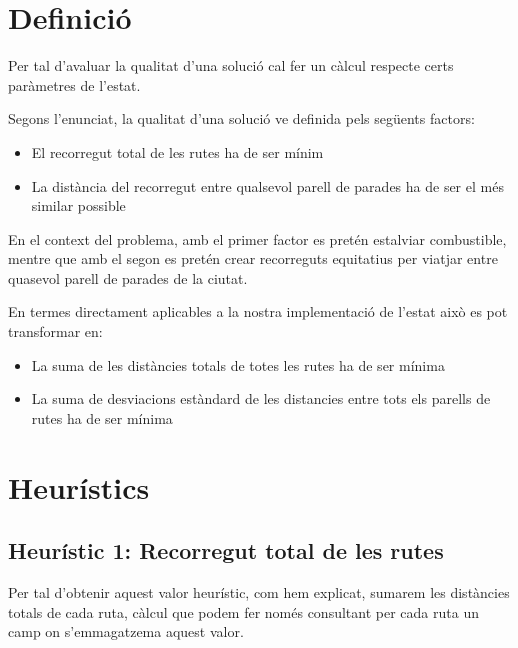
\section{Definició} %
\label{sec:definicio}

Per tal d'avaluar la qualitat d'una solució cal fer un càlcul respecte certs paràmetres de l'estat.

Segons l'enunciat, la qualitat d'una solució ve definida pels següents factors:

\begin{itemize}
	\item El recorregut total de les rutes ha de ser mínim
	\item La distància del recorregut entre qualsevol parell de parades ha de ser el més similar possible
\end{itemize}

En el context del problema, amb el primer factor es pretén estalviar combustible, mentre que amb el segon es pretén crear recorreguts equitatius per viatjar entre quasevol parell de parades de la ciutat.

En termes directament aplicables a la nostra implementació de l'estat això es pot transformar en:

\begin{itemize}
	\item La suma de les distàncies totals de totes les rutes ha de ser mínima
	\item La suma de desviacions estàndard de les distancies entre tots els parells de rutes ha de ser mínima
\end{itemize}


\section{Heurístics} %
\label{sec:heuristics}

\subsection{Heurístic 1: Recorregut total de les rutes} %
\label{sub:heuristic1}

Per tal d'obtenir aquest valor heurístic, com hem explicat, sumarem les distàncies totals de cada ruta, càlcul que podem fer només consultant per cada ruta un camp on s'emmagatzema aquest valor.

